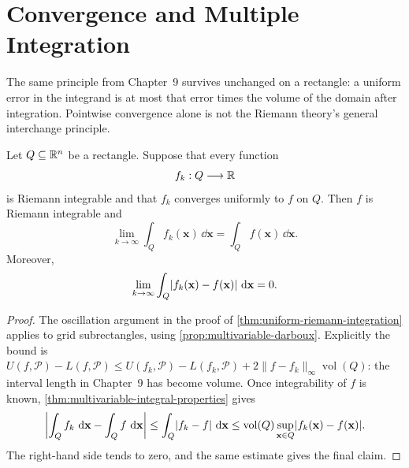 
\begin{center}
\end{center}

\section{Convergence and Multiple Integration}

The same principle from Chapter~9 survives unchanged on a rectangle: a
uniform error in the integrand is at most that error times the volume of the
domain after integration.  Pointwise convergence alone is not the Riemann
theory's general interchange principle.

\begin{theorem}
\label{thm:uniform-multivariable-riemann}
Let \(Q\subseteq\mathbb{R}^n\) be a rectangle.  Suppose that every function
\[
f_k:Q\longrightarrow\mathbb{R}
\]
is Riemann integrable and that \(f_k\) converges uniformly to \(f\) on
\(Q\).  Then \(f\) is Riemann integrable and
\[
\lim_{k\to\infty}\int_Qf_k(\mathbf{x})\,\dd\mathbf{x}
=
\int_Qf(\mathbf{x})\,\dd\mathbf{x}.
\]
Moreover,
\[
\lim_{k\to\infty}\int_Q\lvert f_k(\mathbf{x})-f(\mathbf{x})\rvert\,\mathop{}\!\mathrm{d}\mathbf{x}=0.
\]
\end{theorem}
\begin{proof}
The oscillation argument in the proof of
\cref{thm:uniform-riemann-integration} applies to grid subrectangles, using
\cref{prop:multivariable-darboux}. Explicitly the bound is
$U(f,\mathcal P)-L(f,\mathcal P)\leq
U(f_k,\mathcal P)-L(f_k,\mathcal P)+2\|f-f_k\|_\infty\operatorname{vol}(Q)$:
the interval length in Chapter~9 has become volume.  Once integrability of \(f\) is known,
\cref{thm:multivariable-integral-properties} gives
\[
\left\lvert\int_Qf_k\,\mathop{}\!\mathrm{d}\mathbf{x}-\int_Qf\,\mathop{}\!\mathrm{d}\mathbf{x}\right\rvert
\leq
\int_Q\lvert f_k-f\rvert\,\mathop{}\!\mathrm{d}\mathbf{x}
\leq
\operatorname{vol}(Q)\sup_{\mathbf{x}\in Q}\lvert f_k(\mathbf{x})-f(\mathbf{x})\rvert.
\]
The right-hand side tends to zero, and the same estimate gives the final
claim.
\end{proof}

